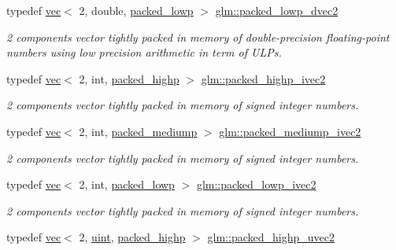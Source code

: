 \begin{DoxyCompactItemize}
typedef \mbox{\hyperlink{structglm_1_1vec}{vec}}$<$ 2, double, \mbox{\hyperlink{namespaceglm_a36ed105b07c7746804d7fdc7cc90ff25ac36a4bd74559be2c0b65bc48e5953b8b}{packed\+\_\+lowp}} $>$ \mbox{\hyperlink{group__gtc__type__aligned_gae61fd7d54de0db35af2b3b7fde2971f2}{glm\+::packed\+\_\+lowp\+\_\+dvec2}}
\begin{DoxyCompactList}\small\item\em 2 components vector tightly packed in memory of double-\/precision floating-\/point numbers using low precision arithmetic in term of U\+L\+Ps. \end{DoxyCompactList}\item 
typedef \mbox{\hyperlink{structglm_1_1vec}{vec}}$<$ 2, int, \mbox{\hyperlink{namespaceglm_a36ed105b07c7746804d7fdc7cc90ff25a8e8791ee77fe079b1291f710d88031bf}{packed\+\_\+highp}} $>$ \mbox{\hyperlink{group__gtc__type__aligned_gae362d70a8be88cc43b6c1ec0992e73db}{glm\+::packed\+\_\+highp\+\_\+ivec2}}
\begin{DoxyCompactList}\small\item\em 2 components vector tightly packed in memory of signed integer numbers. \end{DoxyCompactList}\item 
typedef \mbox{\hyperlink{structglm_1_1vec}{vec}}$<$ 2, int, \mbox{\hyperlink{namespaceglm_a36ed105b07c7746804d7fdc7cc90ff25a9604654c3b137cd7898689fd34b25bc0}{packed\+\_\+mediump}} $>$ \mbox{\hyperlink{group__gtc__type__aligned_ga42af0b51e654d83bd9201e96308942b5}{glm\+::packed\+\_\+mediump\+\_\+ivec2}}
\begin{DoxyCompactList}\small\item\em 2 components vector tightly packed in memory of signed integer numbers. \end{DoxyCompactList}\item 
typedef \mbox{\hyperlink{structglm_1_1vec}{vec}}$<$ 2, int, \mbox{\hyperlink{namespaceglm_a36ed105b07c7746804d7fdc7cc90ff25ac36a4bd74559be2c0b65bc48e5953b8b}{packed\+\_\+lowp}} $>$ \mbox{\hyperlink{group__gtc__type__aligned_gabd82de5d7aef1f8373fe14cd05ce617c}{glm\+::packed\+\_\+lowp\+\_\+ivec2}}
\begin{DoxyCompactList}\small\item\em 2 components vector tightly packed in memory of signed integer numbers. \end{DoxyCompactList}\item 
typedef \mbox{\hyperlink{structglm_1_1vec}{vec}}$<$ 2, \mbox{\hyperlink{group__core__precision_ga4fd29415871152bfb5abd588334147c8}{uint}}, \mbox{\hyperlink{namespaceglm_a36ed105b07c7746804d7fdc7cc90ff25a8e8791ee77fe079b1291f710d88031bf}{packed\+\_\+highp}} $>$ \mbox{\hyperlink{group__gtc__type__aligned_gafd17d664314ead069de290b1d5137c47}{glm\+::packed\+\_\+highp\+\_\+uvec2}}

\end{DoxyCompactItemize}
